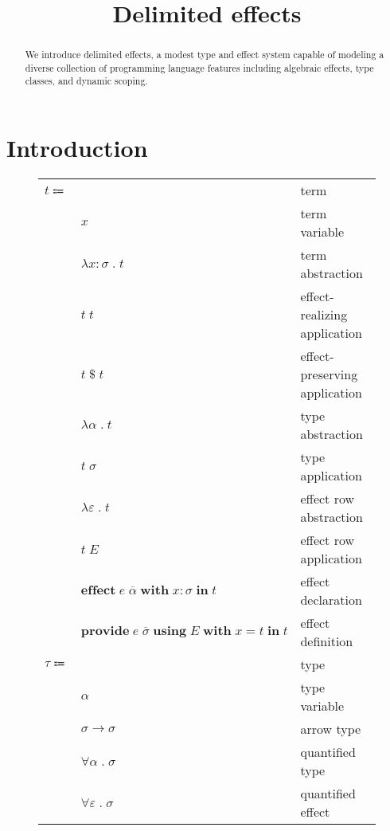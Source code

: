 \documentclass[12pt]{article}
\title{Delimited effects}
\date{}
\newcommand\lstof[1]{\overline{#1}}
\newcommand\eterm{t}
\newcommand\evar{x}
\newcommand\eabs[2]{\lambda #1 \; . \; #2} %
\newcommand\eapp[2]{#1 \; #2}
\newcommand\eappx[2]{#1 \; \$ \; #2}
\newcommand\etabs[2]{\lambda #1 \; . \; #2} %
\newcommand\exabs[2]{\lambda #1 \; . \; #2} %
\newcommand\etapp[2]{#1 \; #2}
\newcommand\exapp[2]{#1 \; #2}
\newcommand\eeffect[4]{\textbf{effect} \; #1 \; \textbf{with} \; \tanno{#2}{#3} \; \textbf{in} \; #4}
\newcommand\eprovide[5]{\textbf{provide} \; #1 \; \textbf{using} \; #2 \; \textbf{with} \; #3 = #4 \; \textbf{in} \; #5}
\newcommand\ttype{\tau}
\newcommand\tvar{\alpha}
\newcommand\tarrow[2]{#1 \rightarrow #2} %
\newcommand\ttforall[2]{\forall #1 \; . \; #2} %
\newcommand\txforall[2]{\forall #1 \; . \; #2} %
\newcommand\tx{\sigma}
\newcommand\tanno[2]{#1 : #2} %
\newcommand\xeffects{E}
\newcommand\xvar{\varepsilon}
\newcommand\xtapp[2]{#1 \; \lstof{#2}}
\newcommand\xeffect{e}
\begin{document}
  \maketitle

  \begin{abstract}
    We introduce delimited effects, a modest type and effect system capable of modeling a diverse collection of programming language features including algebraic effects, type classes, and dynamic scoping.
  \end{abstract}

  \section{Introduction}

  \begin{figure}
    \begin{mdframed}[backgroundcolor=none]
      \begin{center}
        \begin{tabular}{l l l}
          $\eterm \Coloneqq $ & & term \\
          & $\evar$ & term variable \\
          & $\eabs{\tanno{\evar}{\tx}}{\eterm}$ & term abstraction \\
          & $\eapp{\eterm}{\eterm}$ & effect-realizing application \\
          & $\eappx{\eterm}{\eterm}$ & effect-preserving application \\
          & $\etabs{\tvar}{\eterm}$ & type abstraction \\
          & $\etapp{\eterm}{\tx}$ & type application \\
          & $\exabs{\xvar}{\eterm}$ & effect row abstraction \\
          & $\exapp{\eterm}{\xeffects}$ & effect row application \\
          & $\eeffect{\xtapp{\xeffect}{\tvar}}{\evar}{\tx}{\eterm}$ & effect declaration \\
          & $\eprovide{\xtapp{\xeffect}{\tx}}{\xeffects}{\evar}{\eterm}{\eterm}$ & effect definition \\
          $\ttype \Coloneqq$ & & type \\
          & $\tvar$ & type variable \\
          & $\tarrow{\tx}{\tx}$ & arrow type \\
          & $\ttforall{\tvar}{\tx}$ & quantified type \\
          & $\txforall{\xvar}{\tx}$ & quantified effect \\

\end{tabular}
\end{center}
\end{mdframed}
\end{figure}
\end{document}
